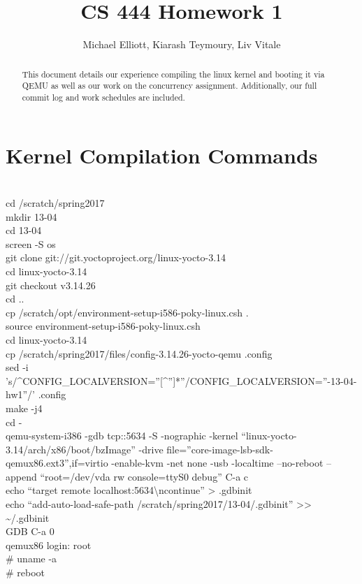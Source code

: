 \documentclass[letterpaper,10pt,titlepage,draftclsnofoot,onecolumn]{IEEEtran}
\title{CS 444 Homework 1}
\author{Michael Elliott, Kiarash Teymoury, Liv Vitale}
\begin{document}
\begin{titlingpage}
\maketitle
\begin{abstract}
This document details our experience compiling the linux kernel and booting it via QEMU as well as our work on the concurrency assignment. Additionally, our full commit log and work schedules are included.
\end{abstract}
\end{titlingpage}

\section{Kernel Compilation Commands}
\\\textdollar{} cd /scratch/spring2017
\\\textdollar{} mkdir 13-04
\\\textdollar{} cd 13-04
\\\textdollar{} screen -S os
\\\textdollar{} git clone git://git.yoctoproject.org/linux-yocto-3.14
\\\textdollar{} cd linux-yocto-3.14
\\\textdollar{} git checkout v3.14.26
\\\textdollar{} cd ..
\\\textdollar{} cp /scratch/opt/environment-setup-i586-poky-linux.csh .
\\\textdollar{} source environment-setup-i586-poky-linux.csh
\\\textdollar{} cd linux-yocto-3.14
\\\textdollar{} cp /scratch/spring2017/files/config-3.14.26-yocto-qemu .config
\\\textdollar{} sed -i 's/\^{}CONFIG\_LOCALVERSION=''[\^{}'']*''\textdollar{}/CONFIG\_LOCALVERSION=''-13-04-hw1''/' .config
\\\textdollar{} make -j4
\\\textdollar{} cd -
\\\textdollar{} qemu-system-i386 -gdb tcp::5634 -S -nographic -kernel ``linux-yocto-3.14/arch/x86/boot/bzImage'' -drive file=''core-image-lsb-sdk-qemux86.ext3'',if=virtio -enable-kvm -net none -usb -localtime --no-reboot --append ``root=/dev/vda rw console=ttyS0 debug''
C-a c
\\\textdollar{} echo ``target remote localhost:5634\textbackslash{}ncontinue'' \textgreater{} .gdbinit
\\\textdollar{} echo ``add-auto-load-safe-path /scratch/spring2017/13-04/.gdbinit'' \textgreater{}\textgreater{} \textasciitilde{}/.gdbinit
\\\textdollar{} \textdollar{}GDB
C-a 0
\\qemux86 login: root
\\\# uname -a
\\\# reboot
\end{document}
